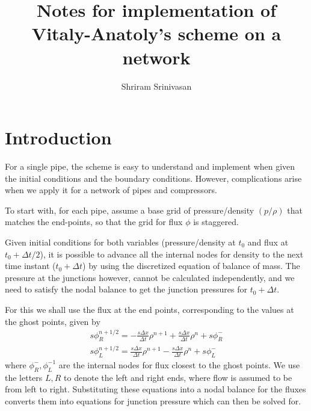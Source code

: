 \documentclass{amsart}
\begin{document}
\title{Notes for implementation  of Vitaly-Anatoly's scheme on a network}

\author{Shriram Srinivasan}
\address{LANL}




\maketitle

\section{Introduction}

For a single pipe, the scheme is easy to understand and implement when given the initial conditions and the boundary conditions. However,  complications arise when we apply it for a network of pipes and compressors.

To start with, for each pipe, assume a base grid  of  pressure/density $(p/\rho)$ that matches the end-points, so that the grid for flux $\phi$ is staggered.  

Given initial conditions for both variables (pressure/density at $t_0$ and flux at $t_0 + \Delta t/2$), it is possible to advance all the internal nodes for density to the next time instant ($t_0 + \Delta t$) by using the discretized equation of balance of mass.  The pressure at the junctions however, cannot be calculated independently, and we need to satisfy the nodal balance to get the junction pressures for $t_0 + \Delta t$.

For this we shall use the flux at the end points, corresponding to the values at the ghost points, given by
\begin{align}
 s \phi_R^{n+1/2} = -\frac{s \Delta x}{\Delta t}\rho^{n+1} + \frac{s \Delta x}{\Delta t}\rho^{n} + s\phi_R^{-} \\
 s \phi_L^{n+1/2} = \frac{s \Delta x}{\Delta t}\rho^{n+1} - \frac{s \Delta x}{\Delta t}\rho^{n} + s\phi_L^{-}
\end{align}
where $\phi_R^{-}, \phi_L^{-1}$ are the internal nodes for flux closest to the ghost points. 
We use the letters $L, R$ to denote the left and right ends, where flow is assumed to be from left to right.
Substituting these equations into a nodal balance for the fluxes converts them into equations for junction pressure which can then be solved for.
\end{document}
